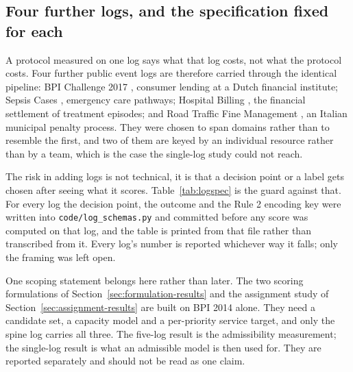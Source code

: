 \subsection{Four further logs, and the specification fixed for each}
\label{sec:four-logs}

A protocol measured on one log says what that log costs, not what the protocol costs. Four
further public event logs are therefore carried through the identical pipeline: BPI
Challenge 2017 \citep{dongen2017challenge}, consumer lending at a Dutch financial
institute; Sepsis Cases \citep{mannhardt2016sepsis}, emergency care pathways; Hospital
Billing \citep{mannhardt2017billing}, the financial settlement of treatment episodes; and
Road Traffic Fine Management \citep{deleoni2015roadfines}, an Italian municipal penalty
process. They were chosen to span domains rather than to resemble the first, and two of them
are keyed by an individual resource rather than by a team, which is the case the single-log
study could not reach.

The risk in adding logs is not technical, it is that a decision point or a label gets chosen
after seeing what it scores. Table~\ref{tab:logspec} is the guard against that. For every
log the decision point, the outcome and the Rule 2 encoding key were written into
\texttt{code/log\_schemas.py} and committed before any score was computed on that log, and
the table is printed from that file rather than transcribed from it. Every log's number is
reported whichever way it falls; only the framing was left open.

\begin{table}[htbp]
\centering
\caption{The specification fixed for each log before any score was computed on it, printed
from \texttt{code/log\_schemas.py}. The final column counts case attributes admissible at
$t_{\mathrm{dec}}$ against those recorded but not knowable there. For BPI 2014 those eight
admissible attributes expand into the seventeen model features of Table~\ref{tab:cost}; the
other four logs use the attributes directly. Where a definition needed a paragraph of
rationale, the first sentence is shown and the rest is in the schema file.}
\label{tab:logspec}
\small


\end{table}

One scoping statement belongs here rather than later. The two scoring formulations of
Section~\ref{sec:formulation-results} and the assignment study of
Section~\ref{sec:assignment-results} are built on BPI 2014 alone. They need a candidate set,
a capacity model and a per-priority service target, and only the spine log carries all three.
The five-log result is the admissibility measurement; the single-log result is what an
admissible model is then used for. They are reported separately and should not be read as one
claim.

